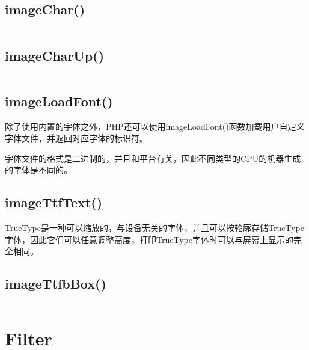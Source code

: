 \begin{lstlisting}[language=PHP]

\end{lstlisting}


\subsection{imageChar()}


\begin{lstlisting}[language=PHP]

\end{lstlisting}


\subsection{imageCharUp()}


\begin{lstlisting}[language=PHP]

\end{lstlisting}

\subsection{imageLoadFont()}


除了使用内置的字体之外，PHP还可以使用imageLoadFont()函数加载用户自定义字体文件，并返回对应字体的标识符。

字体文件的格式是二进制的，并且和平台有关，因此不同类型的CPU的机器生成的字体是不同的。

\subsection{imageTtfText()}


TrueType是一种可以缩放的，与设备无关的字体，并且可以按轮廓存储TrueType字体，因此它们可以任意调整高度，打印TrueType字体时可以与屏幕上显示的完全相同。


\subsection{imageTtfbBox()}




\begin{lstlisting}[language=PHP]

\end{lstlisting}



\section{Filter}


